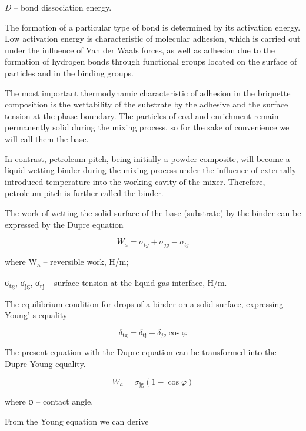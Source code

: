 \begin{multicols}{2}
\emph{D} -- bond dissociation energy.

The formation of a particular type of bond is determined by its
activation energy. Low activation energy is characteristic of molecular
adhesion, which is carried out under the influence of Van der Waals
forces, as well as adhesion due to the formation of hydrogen bonds
through functional groups located on the surface of particles and in the
binding groups.

The most important thermodynamic characteristic of adhesion in the
briquette composition is the wettability of the substrate by the
adhesive and the surface tension at the phase boundary. The particles of
coal and enrichment remain permanently solid during the mixing process,
so for the sake of convenience we will call them the base.

In contrast, petroleum pitch, being initially a powder composite, will
become a liquid wetting binder during the mixing process under the
influence of externally introduced temperature into the working cavity
of the mixer. Therefore, petroleum pitch is further called the binder.

The work of wetting the solid surface of the base (substrate) by the
binder can be expressed by the Dupre equation

\begin{equation*}
    W_a = \sigma_{tg} + \sigma_{jg} - \sigma_{tj}
\end{equation*}

where W\textsubscript{a} -- reversible work, Н/m;

σ\textsubscript{tg}, σ\textsubscript{jg}, σ\textsubscript{tj} -- surface
tension at the liquid-gas interface, Н/m.

The equilibrium condition for drops of a binder on a solid surface,
expressing Young' s equality

\begin{equation*}
    \delta_{\text{tg}} = \delta_{\text{tj}} + \delta_{jg} \cos\varphi
\end{equation*}

The present equation with the Dupre equation can be transformed into the
Dupre-Young equality.

\begin{equation*}
    W_a = \sigma_{\text{jg}} (1 - \cos\varphi)
\end{equation*}

where φ -- contact angle.

From the Young equation we can derive


\end{multicols}
